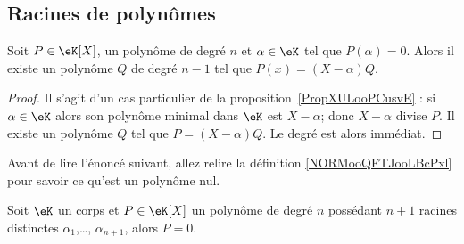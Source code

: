\subsection{Racines de polynômes}

\begin{corollary}   \label{CorDIYooEtmztc}
    Soit \( P\in \eK[X]\), un polynôme de degré \( n\) et \( \alpha\in \eK\) tel que \( P(\alpha)=0\). Alors il existe un polynôme \( Q\) de degré \( n-1\) tel que \( P(x)=(X-\alpha)Q\).
\end{corollary}

\begin{proof}
    Il s'agit d'un cas particulier de la proposition~\ref{PropXULooPCusvE} : si \( \alpha\in \eK\) alors son polynôme minimal dans \( \eK\) est \( X-\alpha\); donc \( X-\alpha\) divise \( P\). Il existe un polynôme \( Q\) tel que \( P=(X-\alpha)Q\). Le degré est alors immédiat.
\end{proof}

Avant de lire l'énoncé suivant, allez relire la définition \ref{NORMooQFTJooLBcPxl} pour savoir ce qu'est un polynôme nul.
\begin{theorem}\label{ThoLXTooNaUAKR}
    Soit \( \eK\) un corps et \( P\in \eK[X]\) un polynôme de degré \( n\) possédant \( n+1\) racines distinctes \( \alpha_1\),\ldots, \( \alpha_{n+1}\), alors \( P=0\).
\end{theorem}

